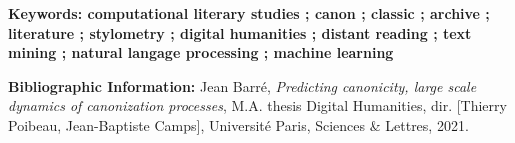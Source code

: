 

\medskip

\textbf{Keywords: computational literary studies ; canon ; classic ; archive ; literature ; stylometry ; digital humanities ; distant reading ; text mining ; natural langage processing ; machine learning}

\textbf{Bibliographic Information:} Jean Barré, \textit{Predicting canonicity, large scale dynamics of canonization processes}, M.A. thesis \og Digital Humanities\fg{}, dir. [Thierry Poibeau, Jean-Baptiste Camps], Université Paris, Sciences \& Lettres, 2021.


\clearpage